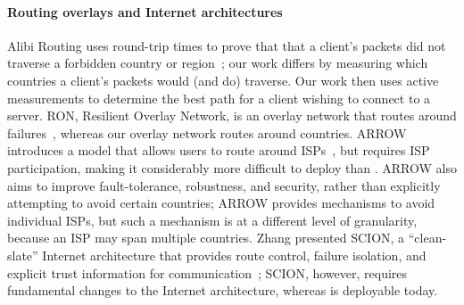 \paragraph{Routing overlays and Internet architectures} Alibi Routing uses
round-trip times to prove that that a client's packets did  not traverse a
forbidden country or region~\cite{levin2015alibi,levin_detour}; our work differs by
measuring  which countries a client's packets would (and do) traverse.  Our
work then  uses active measurements to determine the best path for a client
wishing  to connect to a server.  RON, Resilient Overlay Network, is an
overlay network that  routes around failures~\cite{andersen2001resilient}, whereas our overlay network
routes around countries.  ARROW introduces a
model that allows users to route around ISPs~\cite{peter2015one}, but requires
ISP participation, making it considerably more difficult to deploy than
\system{}. ARROW also aims to improve fault-tolerance, robustness, and
security, rather than explicitly attempting to avoid certain countries; ARROW
provides mechanisms to avoid individual ISPs, but such a mechanism is at a
different level of granularity, because an ISP may span multiple countries.
Zhang \ea{} presented SCION, a ``clean-slate'' Internet architecture that
provides route control, failure isolation, and explicit trust information for
communication~\cite{zhang2011scion}; SCION, however, requires fundamental
changes to the Internet architecture, whereas \system{} is deployable today.

